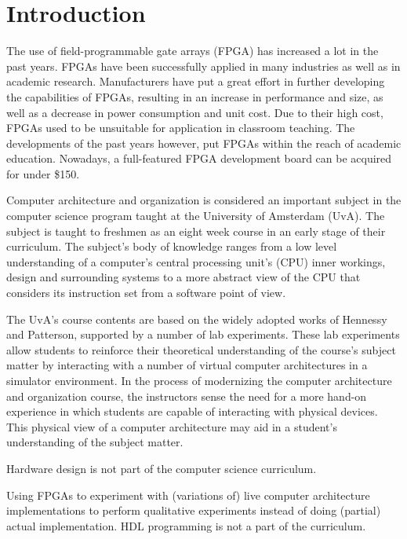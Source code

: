 \documentclass[main.tex]{subfiles}
\begin{document}
\chapter{Introduction}
\label{chapterintroduction}
The use of field-programmable gate arrays (FPGA) has increased a lot in the past years. FPGAs have been successfully applied in many industries as well as in academic research. Manufacturers have put a great effort in further developing the capabilities of FPGAs, resulting in an increase in performance and size, as well as a decrease in power consumption and unit cost. Due to their high cost, FPGAs used to be unsuitable for application in classroom teaching. The developments of the past years however, put FPGAs within the reach of academic education. Nowadays, a full-featured FPGA development board can be acquired for under \$150. 

Computer architecture and organization is considered an important subject in the computer science program taught at the University of Amsterdam (UvA). The subject is taught to freshmen as an eight week course in an early stage of their curriculum. The subject's body of knowledge ranges from a low level understanding of a computer's central processing unit's (CPU) inner workings, design and surrounding systems to a more abstract view of the CPU that considers its instruction set from a software point of view.

The UvA's course contents are based on the widely adopted works of Hennessy and Patterson, supported by a number of lab experiments. These lab experiments allow students to reinforce their theoretical understanding of the course's subject matter by interacting with a number of virtual computer architectures in a simulator environment. In the process of modernizing the computer architecture and organization course, the instructors sense the need for a more hand-on experience in which students are capable of interacting with physical devices. This physical view of a computer architecture may aid in a student's understanding of the subject matter.

Hardware design is not part of the computer science curriculum.

Using FPGAs to experiment with (variations of) live computer architecture implementations to perform qualitative experiments instead of doing (partial) actual implementation. HDL programming is not a part of the curriculum.
\end{document}
